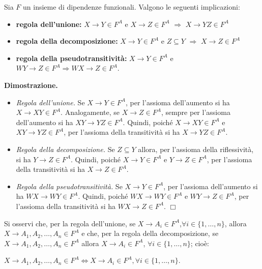 \begin{theo}
Sia $F$ un insieme di dipendenze funzionali. Valgono le seguenti implicazioni:
\begin{itemize}
 \item \textbf{regola dell'unione: } $X\rightarrow Y \in F^A$ e $X\rightarrow Z \in F^A$ $\Rightarrow$ 
 $X\rightarrow YZ \in F^A$
 \item \textbf{regola della decomposizione: } $X\rightarrow Y \in F^A$ e $Z\subseteq Y$ $\Rightarrow$ 
 $X\rightarrow Z \in F^A$
 \item \textbf{regola della pseudotransitività: }$X\rightarrow Y \in F^A$ e $WY\rightarrow Z \in F^A 
 \Rightarrow WX\rightarrow Z \in F^A$.
\end{itemize}
\end{theo}
\textbf{Dimostrazione.}
\begin{itemize}
 \item \emph{Regola dell'unione.} Se $X\rightarrow Y \in F^A$, per l'assioma dell'aumento si ha $X\rightarrow 
 XY \in F^A$. Analogamente, se $X\rightarrow Z \in F^A$, sempre per l'assioma dell'aumento si ha $XY 
 \rightarrow YZ \in F^A$. Quindi, poiché $X \rightarrow XY \in F^A$ e $XY \rightarrow YZ \in F^A$, 
 per l'assioma della transitività si ha $X \rightarrow YZ \in F^A$.
 \item \emph{Regola della decomposizione.} Se $Z \subseteq Y$ allora, per l'assioma della riflessività, si ha 
 $Y \rightarrow Z \in F^A$. Quindi, poiché $X \rightarrow Y \in F^A$ e $Y \rightarrow Z \in F^A$, per l'assioma
 della transitività si ha $X\rightarrow Z \in F^A$.
 \item \emph{Regola della pseudotransitività.} Se $X \rightarrow Y \in F^A$, per l'assioma dell'aumento si 
 ha $WX \rightarrow WY \in F^A$. Quindi, poiché $WX \rightarrow WY \in F^A$ e $WY \rightarrow Z \in F^A$, 
 per l'assioma della transitività si ha $WX\rightarrow Z \in F^A$. $\Box$
\end{itemize}

Si osservi che, per la regola dell'unione, se $X\rightarrow A_i \in F^A$,$\forall i \in \{1, \ldots,n\}$, 
allora $X \rightarrow A_1, A_2, \ldots, A_n \in F^A$ e che, per la regola della decomposizione, 
se $X \rightarrow A_1, A_2, \ldots, A_n \in F^A$ allora $X\rightarrow A_i \in F^A$, $\forall i \in \{1, 
\ldots, n\}$; cioè:
\begin{center}
 \begin{math}
  X\rightarrow A_1, A_2, \ldots, A_n \in F^A \Leftrightarrow X \rightarrow A_i \in F^A, \forall i \in \{1, \ldots, n\}.
 \end{math}
\end{center}


